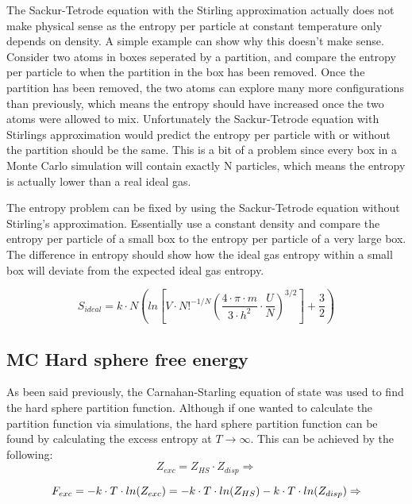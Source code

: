 The Sackur-Tetrode equation with the Stirling approximation actually does not make physical sense as the entropy per particle at constant temperature only depends on density. A simple example can show why this doesn't make sense. Consider two atoms in boxes seperated by a partition, and compare the entropy per particle to when the partition in the box has been removed. Once the partition has been removed, the two atoms can explore many more configurations than previously, which means the entropy should have increased once the two atoms were allowed to mix. Unfortunately the Sackur-Tetrode equation with Stirlings approximation would predict the entropy per particle with or without the partition should be the same. This is a bit of a problem since every box in a Monte Carlo simulation will contain exactly N particles, which means the entropy is actually lower than a real ideal gas.

The entropy problem can be fixed by using the Sackur-Tetrode equation without Stirling's approximation. Essentially use a constant density and compare the entropy per particle of a small box to the entropy per particle of a very large box. The difference in entropy should show how the ideal gas entropy within a small box will deviate from the expected ideal gas entropy.

\begin{equation}\label{eq:sackurTetrode}
S_{ideal}=k\cdot N \left ( ln\left [ V\cdot N!^{-1/N}\left ( \frac{4\cdot \pi\cdot m}{3\cdot h^2}\cdot\frac{U}{N} \right)^{3/2}  \right]+\frac{3}{2}\right )
\end{equation}



\subsection{MC Hard sphere free energy}
As been said previously, the Carnahan-Starling equation of state was used to find the hard sphere partition function. Although if one wanted to calculate the partition function via simulations, the hard sphere partition function can be found by calculating the excess entropy at $T\to\infty$. This can be achieved by the following:
\begin{equation}\label{eq:MCHS1}
Z_{exc}=Z_{HS}\cdot Z_{disp}\Rightarrow
\end{equation}

\begin{equation}\label{eq:MCHS2}
\newline F_{exc}=-k\cdot T\cdot ln(Z_{exc})=-k\cdot T\cdot ln(Z_{HS})-k\cdot T\cdot ln(Z_{disp})\Rightarrow 
\end{equation}

